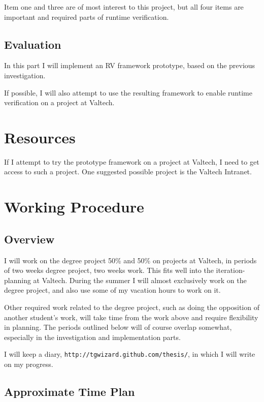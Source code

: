 \documentclass[a4paper,11pt]{article}
\begin{document}
Item one and three are of most interest to this project, but all four items are
important and required parts of runtime verification.


\subsection{Evaluation}

In this part I will implement an RV framework prototype, based on the previous
investigation.

If possible, I will also attempt to use the resulting framework to enable runtime verification on a project at Valtech.


\section{Resources}

If I attempt to try the prototype framework on a project at Valtech, I need to get access to such a project. One suggested possible project is the Valtech Intranet.


\section{Working Procedure}

\subsection{Overview}

I will work on the degree project 50\% and 50\% on projects at Valtech, in periods of
two weeks degree project, two weeks work. This fits well into the iteration-planning at
Valtech. During the summer I will almost exclusively work on the degree project, and also
use some of my vacation hours to work on it.

Other required work related to the degree project, such as doing the opposition of
another student's work, will take time from the work above and require
flexibility in planning. The periods outlined below will of course overlap
somewhat, especially in the investigation and implementation parts.

I will keep a diary, \texttt{http://tgwizard.github.com/thesis/}, in which I will write on my progress. 

\subsection{Approximate Time Plan}
\end{document}
